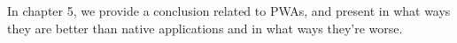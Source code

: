 \documentclass[12pt]{report}
\begin{document}
In chapter 5, we provide a conclusion related to PWAs, and present in what ways they are better than native applications and in what ways they're worse.

\tableofcontents


\newpage
{}









% 

\end{document}

